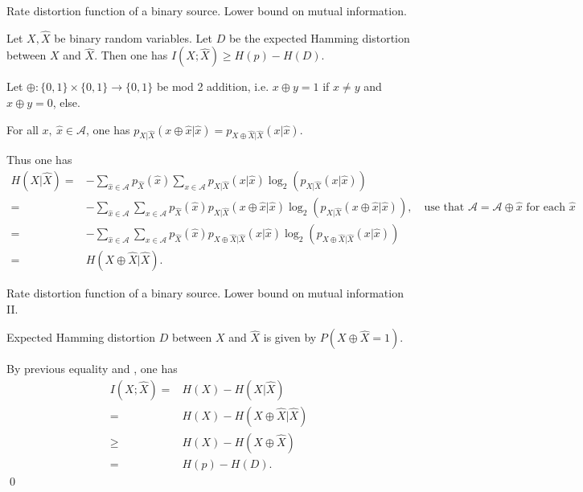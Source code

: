 \begin{frame}{Rate distortion function of a binary source. Lower bound on mutual information.}
\begin{lemma}
Let $X,\hat{X}$ be binary random variables. Let $D$ be the expected Hamming distortion between $X$ and $\hat{X}$. Then one has
$I(X;\hat{X})\geq H(p)-H(D)$.
\end{lemma}
 \bit
 \item Let $\oplus:\{0,1\}\times\{0,1\}\to\{0,1\}$ be mod 2 addition, i.e. $x\oplus y=1$ if $x\neq y$ and $x\oplus y=0$, else. 
\item For all $x,\:\hat{x}\in\mathcal{A}$, one has $p_{X|\hat{X}}(x\oplus\hat{x}|\hat{x})=p_{X\oplus\hat{X}|\hat{X}}(x|\hat{x})$. 
\item [\iarrow] Thus one has
\begin{align*}
H(X|\hat{X})=&-\sum_{\hat{x}\in\mathcal{A}}p_{\hat{X}}(\hat{x})\sum_{x\in\mathcal{A}}p_{X|\hat{X}}(x|\hat{x})\log_2(p_{X|\hat{X}}(x|\hat{x}))\\
=&-\sum_{\hat{x}\in\mathcal{A}}\sum_{x\in\mathcal{A}}p_{\hat{X}}(\hat{x})p_{X|\hat{X}}(x\oplus\hat{x}|\hat{x})\log_2(p_{X|\hat{X}}(x\oplus\hat{x}|\hat{x})),\quad\text{use that $\mathcal{A}=\mathcal{A}\oplus \hat{x}$ for each $\hat{x}$}\\
=&-\sum_{\hat{x}\in\mathcal{A}}\sum_{x\in\mathcal{A}}p_{\hat{X}}(\hat{x})p_{X\oplus\hat{X}|\hat{X}}(x|\hat{x})\log_2(p_{X\oplus\hat{X}|\hat{X}}(x|\hat{x}))\\ =&H(X\oplus\hat{X}|\hat{X}).
\end{align*}
\eit
\end{frame}

\begin{frame}{Rate distortion function of a binary source. Lower bound on mutual information II.}
\bit
\item Expected Hamming distortion $D$ between $X$ and $\hat{X}$ is given by $P(X\oplus\hat{X}=1)$. 
\item [\iarrow] By previous equality and , one has 
\begin{align*}
I(X;\hat{X})=&H(X)-H(X|\hat{X})\\ =&H(X)-H(X\oplus\hat{X}|\hat{X})\\ \geq &H(X)-H(X\oplus\hat{X})\\ =&H(p)-H(D). 
\end{align*}
\eit
\qed
\end{frame}

